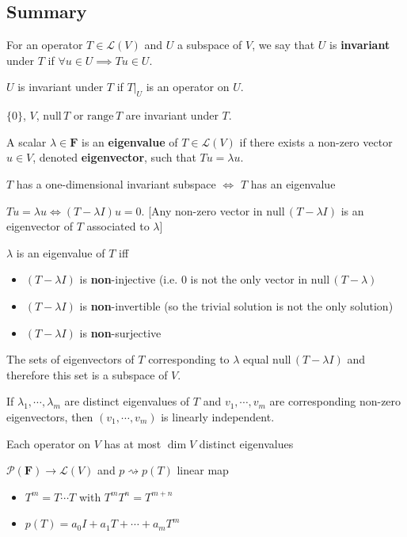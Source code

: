 \documentclass[11pt,notitlepage,oneside]{article}
\DeclareMathOperator{\dimension}{dim}
\newcommand{\nullspace}[1]{\mathrm{null}\,{#1}}
\newcommand{\rangespace}[1]{\mathrm{range}\,{#1}}
\begin{document}
\subsection*{Summary}
\begin{description}
\item For an operator $T\in\mathcal{L}(V)$ and $U$ a subspace of $V$, we say that $U$ is \textbf{invariant} under $T$ if $\forall u\in U \implies Tu\in U$.
\item $U$ is invariant under $T$ if $T|_U$ is an operator on $U$.
\item $\{0\}$, $V$, $\nullspace{T}$ or $\rangespace{T}$ are invariant under $T$.
%
\item A scalar $\lambda\in \mathbf{F}$ is an \textbf{eigenvalue} of $T\in\mathcal{L}(V)$ if there exists a non-zero vector $u\in V$, denoted \textbf{eigenvector}, such that $Tu=\lambda u$.
\item $T$ has a one-dimensional invariant subspace $\iff$ $T$ has an eigenvalue
\item $Tu = \lambda u \iff (T-\lambda I)u=0$. [Any non-zero vector in $\nullspace{(T-\lambda I)}$ is an eigenvector of $T$ associated to $\lambda$]
\item $\lambda$ is an eigenvalue of $T$ iff
\begin{itemize}
\item $(T-\lambda I)$ is \textbf{non}-injective (i.e. $0$ is not the only vector in $\nullspace{(T-\lambda)}$
\item $(T-\lambda I)$ is \textbf{non}-invertible (so the trivial solution is not the only solution)
\item $(T-\lambda I)$ is \textbf{non}-surjective
\end{itemize}
\item The sets of eigenvectors of $T$ corresponding to $\lambda$ equal $\nullspace{(T-\lambda I)}$ and therefore this set is a subspace of $V$.
%
\item[T6] If $\lambda_1,\cdots,\lambda_m$ are distinct eigenvalues of $T$ and $v_1,\cdots,v_m$ are corresponding non-zero eigenvectors, then $(v_1,\cdots, v_m)$ is linearly independent. 
%
\item[C9] Each operator on $V$ has at most $\dimension{V}$ distinct eigenvalues
%
\item $\mathcal{P}(\mathbf{F})\to \mathcal{L}(V)$ and $p \rightsquigarrow p(T)$ linear map
\begin{itemize}
\item $T^m = T\cdots T$ with $T^mT^n = T^{m+n}$
\item $p(T)=a_0I+ a_1 T+ \cdots + a_m T^m$

\end{itemize}
\end{description}
\end{document}
